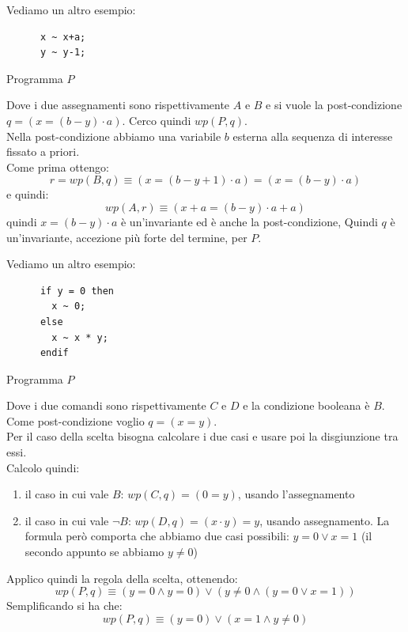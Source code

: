 				      				\begin{esempio}
				      					Vediamo un altro esempio:
				      					\begin{listing}[H]
				      						\begin{lstlisting}
      x ~ x+a;
      y ~ y-1;
				      						\end{lstlisting}
				      						\caption{Programma $P$}
				      					\end{listing}
				      					Dove i due assegnamenti sono rispettivamente $A$ e $B$ e si vuole la
				      					post-condizione $q=(x=(b-y)\cdot a)$. Cerco quindi $wp(P, q)$.\\
				      					Nella post-condizione abbiamo una variabile $b$ esterna alla sequenza di interesse
				      					fissato a priori.\\
				      					Come prima ottengo:
				      					\[r=wp(B, q)\equiv(x=(b-y+1)\cdot a)=(x=(b-y)\cdot a)\]
				      					e quindi:
				      					\[wp(A, r)\equiv(x+a=(b-y)\cdot a+a)\]
				      					quindi $x=(b-y)\cdot a$ è un'invariante ed è anche la post-condizione, Quindi $q$
				      					è un'invariante, accezione più forte del termine, per $P$.
				      				\end{esempio}
				      				\begin{esempio}
				      					Vediamo un altro esempio:
				      					\begin{listing}[H]
				      						\begin{lstlisting}
      if y = 0 then
        x ~ 0;
      else
        x ~ x * y;
      endif
				      						\end{lstlisting}
				      						\caption{Programma $P$}
				      					\end{listing}
				      					Dove i due comandi sono rispettivamente $C$ e $D$ e la condizione booleana è
				      					$B$. Come post-condizione voglio $q=(x=y)$.\\
				      					Per il caso della scelta bisogna calcolare i due casi e usare poi la
				      					disgiunzione tra essi.\\
				      					Calcolo quindi:
				      					\begin{enumerate}
				      						\item il caso in cui vale $B$: $wp(C, q)=(0=y)$, usando l'assegnamento
				      						\item il caso in cui vale $\neg B$: $wp(D, q)=(x\cdot y)=y$, usando
				      						      assegnamento. La formula però comporta che abbiamo due casi possibili: $y=0\lor
				      						      x=1$ (il secondo appunto se abbiamo $y\neq 0$)
				      					\end{enumerate}
				      					Applico quindi la regola della scelta, ottenendo:
				      					\[wp(P, q)\equiv (y=0\land y=0)\lor(y\neq 0\land (y=0\lor x=1))\]
				      					Semplificando si ha che:
				      					\[wp(P, q)\equiv(y=0)\lor(x=1\land y\neq 0)\]
				      				\end{esempio}
